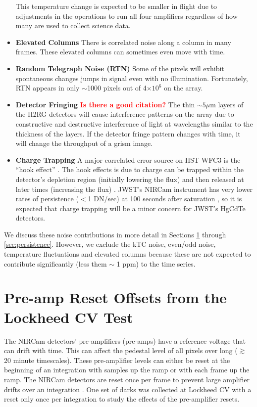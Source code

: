 \documentclass{aastex62}
\begin{document}
\begin{itemize}[noitemsep]
	This temperature change is expected to be smaller in flight due to adjustments in the operations to run all four amplifiers regardless of how many are used to collect science data.
	\item \textbf{Elevated Columns} There is correlated noise along a column in many frames. These elevated columns can sometimes even move with time.
	\item \textbf{Random Telegraph Noise (RTN)} Some of the pixels will exhibit spontaneous changes jumps in signal even with no illumination. Fortunately, RTN appears in only $\sim$1000 pixels out of 4$\times 10^6$ on the array.
	\item \textbf{Detector Fringing} \textbf{\textcolor{red}{Is there a good citation?}} The thin $\sim 5\mu$m layers of the H2RG detectors will cause interference patterns on the array due to constructive and destructive interference of light at wavelengths similar to the thickness of the layers. If the detector fringe pattern changes with time, it will change the throughput of a grism image.
	\item \textbf{Charge Trapping} A major correlated error source on HST WFC3 is the ``hook effect'' \citep{berta2012flat_gj1214}.
	The hook effects is due to charge can be trapped within the detector's depletion region (initially lowering the flux) and then released at later times (increasing the flux) \citep{zhou2017chargeTrap}.
	JWST's NIRCam instrument has very lower rates of persistence ($<$1 DN/sec) at 100 seconds after saturation \citep{leisenring2016persistence}, so it is expected that charge trapping will be a minor concern for JWST's HgCdTe detectors.
\end{itemize}

We discuss these noise contributions in more detail in Sections \ref{sec:preAmp} through \ref{sec:persistence}.
However, we exclude the kTC noise, even/odd noise, temperature fluctuations and elevated columns because these are not expected to contribute significantly (less them $\sim$ 1 ppm) to the time series.


\section{Pre-amp Reset Offsets from the Lockheed CV Test}\label{sec:preAmp}

The NIRCam detectors' pre-amplifiers (pre-amps) have a reference voltage that can drift with time.
This can affect the pedestal level of all pixels over long ($\gtrsim$ 20 minute timescales).
These pre-amplifier levels can either be reset at the beginning of an integration with samples up the ramp or with each frame up the ramp.
The NIRCam detectors are reset once per frame to prevent large amplifier drifts over an integration \citep{robberto2014refPixPreAmp}.
One set of darks was collected at Lockheed CV with a reset only once per integration to study the effects of the pre-amplifier resets.
\end{document}
